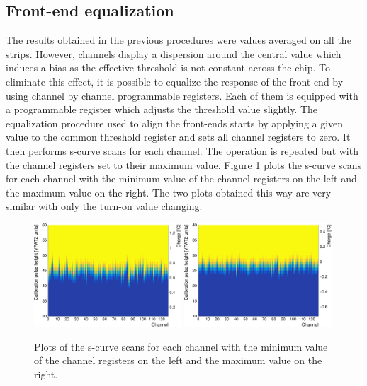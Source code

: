     \subsection{Front-end equalization}

      The results obtained in the previous procedures were values averaged on all the strips. However, channels display a dispersion around the central value which induces a bias as the effective threshold is not constant across the chip. To eliminate this effect, it is possible to equalize the response of the front-end by using channel by channel programmable registers. Each of them is equipped with a programmable register which adjusts the threshold value slightly. The equalization procedure used to align the front-ends starts by applying a given value to the common threshold register and sets all channel registers to zero. It then performs s-curve scans for each channel. The operation is repeated but with the channel registers set to their maximum value. Figure \ref{fig:II-5-trim} plots the s-curve scans for each channel with the minimum value of the channel registers on the left and the maximum value on the right. The two plots obtained this way are very similar with only the turn-on value changing. \\

      \begin{figure}[h!]
        \centering
        \includegraphics[width=0.49\textwidth]{img/plots/cSCurve_ChannelVCal_Trim0-crop}
        \includegraphics[width=0.49\textwidth]{img/plots/cSCurve_ChannelVCal_Trim1-crop}
        \caption{Plots of the s-curve scans for each channel with the minimum value of the channel registers on the left and the maximum value on the right.}
        \label{fig:II-5-trim}
      \end{figure}

